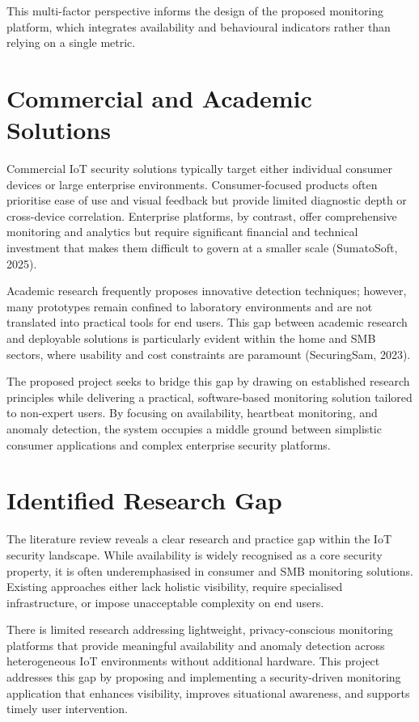 This multi-factor perspective informs the design of the proposed monitoring platform, which integrates availability and behavioural indicators rather than relying on a single metric.

\section{Commercial and Academic Solutions}

Commercial IoT security solutions typically target either individual consumer devices or large enterprise environments. Consumer-focused products often prioritise ease of use and visual feedback but provide limited diagnostic depth or cross-device correlation. Enterprise platforms, by contrast, offer comprehensive monitoring and analytics but require significant financial and technical investment that makes them difficult to govern at a smaller scale (SumatoSoft, 2025).

Academic research frequently proposes innovative detection techniques; however, many prototypes remain confined to laboratory environments and are not translated into practical tools for end users. This gap between academic research and deployable solutions is particularly evident within the home and SMB sectors, where usability and cost constraints are paramount (SecuringSam, 2023).

The proposed project seeks to bridge this gap by drawing on established research principles while delivering a practical, software-based monitoring solution tailored to non-expert users. By focusing on availability, heartbeat monitoring, and anomaly detection, the system occupies a middle ground between simplistic consumer applications and complex enterprise security platforms.

\section{Identified Research Gap}

The literature review reveals a clear research and practice gap within the IoT security landscape. While availability is widely recognised as a core security property, it is often underemphasised in consumer and SMB monitoring solutions. Existing approaches either lack holistic visibility, require specialised infrastructure, or impose unacceptable complexity on end users.

There is limited research addressing lightweight, privacy-conscious monitoring platforms that provide meaningful availability and anomaly detection across heterogeneous IoT environments without additional hardware. This project addresses this gap by proposing and implementing a security-driven monitoring application that enhances visibility, improves situational awareness, and supports timely user intervention.

